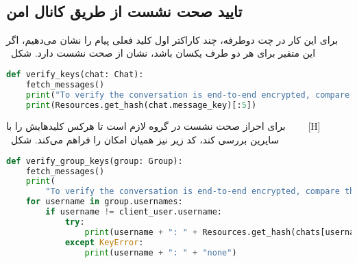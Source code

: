 ‫
‫
‫\subsection{تایید صحت نشست از طریق کانال امن}
‫برای این کار در چت دوطرفه، چند کاراکتر اول کلید فعلی پیام را نشان می‌دهیم، اگر این متفیر برای هر دو طرف یکسان باشد، نشان از صحت نشست دارد. شکل~
‫
\begin{latin}
\begin{lstlisting}[firstnumber=582, language=Python]
def verify_keys(chat: Chat):
    fetch_messages()
    print("To verify the conversation is end-to-end encrypted, compare the following hash of keys with your friend's:")
    print(Resources.get_hash(chat.message_key)[:5])
\end{lstlisting}
\end{latin}
‫
‫[H]
‫
‫
‫
‫
‫
‫
‫برای احراز صحت نشست در گروه لازم است تا هرکس کلیدهایش را با سایرین بررسی کند، کد زیر نیز همیان امکان را فراهم می‌کند. شکل~
\begin{latin}
\begin{lstlisting}[firstnumber=582, language=Python]
def verify_group_keys(group: Group):
    fetch_messages()
    print(
        "To verify the conversation is end-to-end encrypted, compare the following hashes of keys with your friends':")
    for username in group.usernames:
        if username != client_user.username:
            try:
                print(username + ": " + Resources.get_hash(chats[username].message_key)[:5])
            except KeyError:
                print(username + ": " + "none")
\end{lstlisting}
\end{latin}


